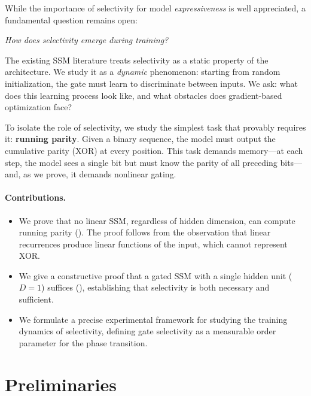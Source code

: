 \documentclass[11pt]{article}
\begin{document}
While the importance of selectivity for model \emph{expressiveness} is well appreciated, a fundamental question remains open:
\begin{center}
\emph{How does selectivity emerge during training?}
\end{center}
The existing SSM literature treats selectivity as a static property of the architecture. We study it as a \emph{dynamic} phenomenon: starting from random initialization, the gate must learn to discriminate between inputs. We ask: what does this learning process look like, and what obstacles does gradient-based optimization face?

To isolate the role of selectivity, we study the simplest task that provably requires it: \textbf{running parity}.
Given a binary sequence, the model must output the cumulative parity (XOR) at every position.
This task demands memory---at each step, the model sees a single bit but must know the parity of all preceding bits---and, as we prove, it demands nonlinear gating.

\paragraph{Contributions.}
\begin{itemize}
    \item We prove that no linear SSM, regardless of hidden dimension, can compute running parity (). The proof follows from the observation that linear recurrences produce linear functions of the input, which cannot represent XOR.
    \item We give a constructive proof that a gated SSM with a single hidden unit ($D=1$) suffices (), establishing that selectivity is both necessary and sufficient.
    \item We formulate a precise experimental framework for studying the training dynamics of selectivity, defining gate selectivity as a measurable order parameter for the phase transition.
\end{itemize}

\section{Preliminaries}
\label{sec:prelim}

\end{document}
